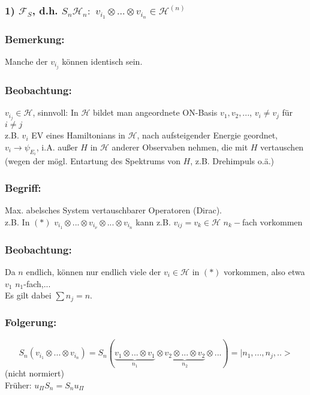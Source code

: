 \documentclass[twoside,a4paper]{scrartcl}
\renewcommand{\1}{\mathds{1}}
\newcommand{\ra}{\rightarrow}
\renewcommand{\H}{\mathcal{H}}
\newcommand{\F}{\mathcal{F}}
\begin{document}
\subsubsection*{1) $\F_S$, d.h. $S_n\H_n:$ $v_{i_1}\otimes ... \otimes v_{i_n}\in \H^{(n)}$} 

\subsubsection*{Bemerkung:} 
Manche der $v_{i_j}$ können identisch sein.

\subsubsection*{Beobachtung:} 
 $v_{i_j}\in \H$, sinnvoll: In $\H$ bildet man angeordnete ON-Basis $v_1,v_2,...$, $v_i \neq v_j$ für $i\neq j$\\
z.B. $v_i$ EV eines Hamiltonians in $\H$, nach aufsteigender Energie geordnet, $v_i\ra \psi_{E_i}$, i.A. außer $H$ in $\H$ anderer Observaben nehmen, die mit $H$ vertauschen (wegen der mögl. Entartung des Spektrums von $H$, z.B. Drehimpuls o.ä.)

\subsubsection*{Begriff:} 
Max. abelsches System vertauschbarer Operatoren (Dirac).\\
z.B. In $(*)$ $v_{i_1}\otimes ... \otimes v_{i_\nu}\otimes ... \otimes v_{i_n}$ kann z.B. $v_{ij}=v_k \in \H$ $n_k-$fach vorkommen

\subsubsection*{Beobachtung:} 
Da $n$ endlich, können nur endlich viele der $v_i \in \H$ in $(*)$ vorkommen, also etwa $v_1$ $n_1$-fach,...\\
Es gilt dabei $\sum n_j=n$.

\subsubsection*{Folgerung:} 
$$S_n(v_{i_1}\otimes ... \otimes v_{i_n})=S_n (\underbrace {v_{1}\otimes ...\otimes v_{1}}_{n_1}\otimes \underbrace {v_{2}\otimes ...\otimes v_{2}}_{n_2}\otimes ...)=|n_1,...,n_j,..>$$
(nicht normiert)\\
Früher: $u_\Pi S_n= S_n u_\Pi$
\end{document}
